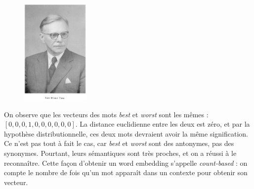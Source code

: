 \documentclass[11pt, a4paper]{report}
\begin{document}
\begin{table}[h]
    \caption{Contextes d'une phrase.} 
    \label{tab:sémantique-distr-exemple} 
\end{table}

\begin{figure}[h]
  \centering
  \includegraphics[width=0.3\textwidth]{firth.png}
  \label{fig:firth}
\end{figure}

On observe que les vecteurs des mots \textit{best} et \textit{worst} sont les mêmes :
$[0,0,0,1,0,0,0,0,0,0]$. La distance euclidienne entre les deux est zéro, et par la 
hypothèse distributionnelle, ces deux mots devraient avoir la même signification. Ce n'est pas 
tout à fait le cas, car \textit{best} et \textit{worst} sont des antonymes, pas des synonymes. 
Pourtant, leurs sémantiques sont très proches, et on a réussi à le reconnaître.
Cette façon d'obtenir un word embedding s'appelle \textit{count-based} : on compte le nombre de fois 
qu'un mot apparaît dans un contexte pour obtenir son vecteur.  
\end{document}
